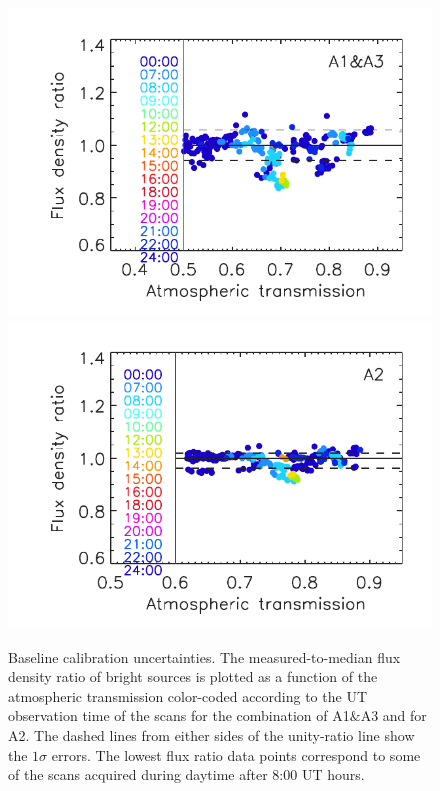 %
\begin{figure}[!thbp]
  \begin{center}
    \includegraphics[clip=true, trim={0.9cm, 0.2cm, 0.5cm, 0.7cm},width=0.65\linewidth]{Figures/plot_flux_density_ratio_obstau_allbright_obsdate_corrected_skydip_narrow_1mm.pdf}
     \includegraphics[clip=true, trim={0.9cm, 0.2cm, 0.5cm, 0.7cm},width=0.65\linewidth]{Figures/plot_flux_density_ratio_obstau_allbright_obsdate_corrected_skydip_narrow_a2.pdf}
    
    \caption[Baseline calibration rms error estimate]{Baseline
      calibration uncertainties. The
      measured-to-median flux density ratio of bright sources is
      plotted as a function of the atmospheric transmission
      color-coded according to the UT
      observation time of the scans for the combination of A1$\&$A3
      and for A2. 
      The dashed lines from either sides of the
      unity-ratio line
      show the $1\sigma$ %
      errors.
      The lowest flux ratio data points correspond to some of the
      scans acquired during daytime after 8:00 UT hours.
    }
    \label{fig:allbright_rms_corrected_skydip}
  \end{center}
\end{figure}




